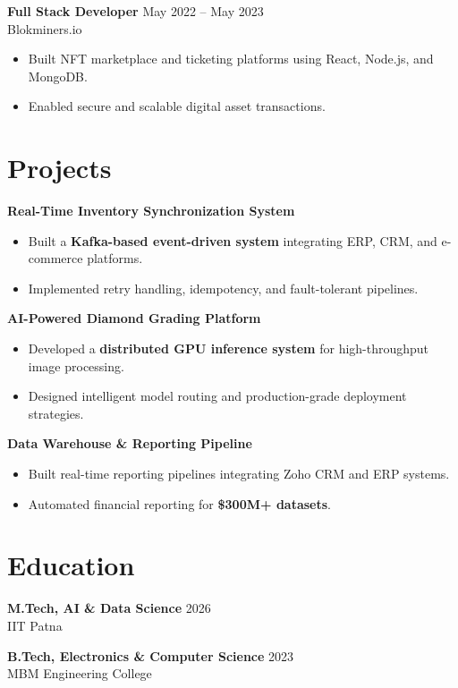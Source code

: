 \documentclass[a4paper,10pt]{article}
\begin{document}
\textbf{Full Stack Developer} \hfill May 2022 -- May 2023 \\
Blokminers.io
\begin{itemize}[leftmargin=*]
    \item Built NFT marketplace and ticketing platforms using React, Node.js, and MongoDB.
    \item Enabled secure and scalable digital asset transactions.
\end{itemize}

\section*{Projects}

\textbf{Real-Time Inventory Synchronization System}
\begin{itemize}[leftmargin=*]
    \item Built a \textbf{Kafka-based event-driven system} integrating ERP, CRM, and e-commerce platforms.
    \item Implemented retry handling, idempotency, and fault-tolerant pipelines.
\end{itemize}

\textbf{AI-Powered Diamond Grading Platform}
\begin{itemize}[leftmargin=*]
    \item Developed a \textbf{distributed GPU inference system} for high-throughput image processing.
    \item Designed intelligent model routing and production-grade deployment strategies.
\end{itemize}

\textbf{Data Warehouse \& Reporting Pipeline}
\begin{itemize}[leftmargin=*]
    \item Built real-time reporting pipelines integrating Zoho CRM and ERP systems.
    \item Automated financial reporting for \textbf{\$300M+ datasets}.
\end{itemize}

\section*{Education}

\textbf{M.Tech, AI \& Data Science} \hfill 2026 \\
IIT Patna

\textbf{B.Tech, Electronics \& Computer Science} \hfill 2023 \\
MBM Engineering College
\end{document}

